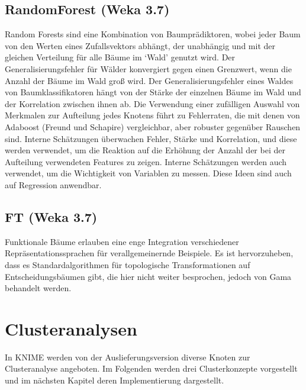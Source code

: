 \documentclass[12pt,					%
							 oneside,			%
							 a4paper,			%
							 halfparskip,		%
							 liststotoc,			%
							 bibtotoc,			%
							 fleqn,				%
							 pointlessnumbers]	%
							 {scrreprt}
\begin{document}
		\subsection{RandomForest (Weka 3.7)}			
			Random Forests sind eine Kombination von Baumprädiktoren, wobei jeder Baum von den Werten eines Zufallsvektors abhängt, der unabhängig und mit der gleichen Verteilung für alle Bäume im `Wald' genutzt wird. Der Generalisierungsfehler für Wälder konvergiert gegen einen Grenzwert, wenn die Anzahl der Bäume im Wald groß wird. Der Generalisierungsfehler eines Waldes von Baumklassifikatoren hängt von der Stärke der einzelnen Bäume im Wald und der Korrelation zwischen ihnen ab. Die Verwendung einer zufälligen Auswahl von Merkmalen zur Aufteilung jedes Knotens führt zu Fehlerraten, die mit denen von Adaboost (Freund und Schapire) vergleichbar, aber robuster gegenüber Rauschen sind. Interne Schätzungen überwachen Fehler, Stärke und Korrelation, und diese werden verwendet, um die Reaktion auf die Erhöhung der Anzahl der bei der Aufteilung verwendeten Features zu zeigen. Interne Schätzungen werden auch verwendet, um die Wichtigkeit von Variablen zu messen. Diese Ideen sind auch auf Regression anwendbar. \cite{Breiman2001}		
			
		\subsection{FT (Weka 3.7)}
			Funktionale Bäume erlauben eine enge Integration verschiedener Repräsentationssprachen für verallgemeinernde Beispiele. Es ist hervorzuheben, dass es Standardalgorithmen für topologische Transformationen auf Entscheidungsbäumen gibt, die hier nicht weiter besprochen, jedoch von Gama behandelt werden.\cite{Gama2004}
			

	\section{Clusteranalysen}
		In KNIME werden von der Auslieferungsversion diverse Knoten zur Clusteranalyse angeboten. Im Folgenden werden drei Clusterkonzepte vorgestellt und im nächsten Kapitel deren Implementierung dargestellt.
\end{document}
